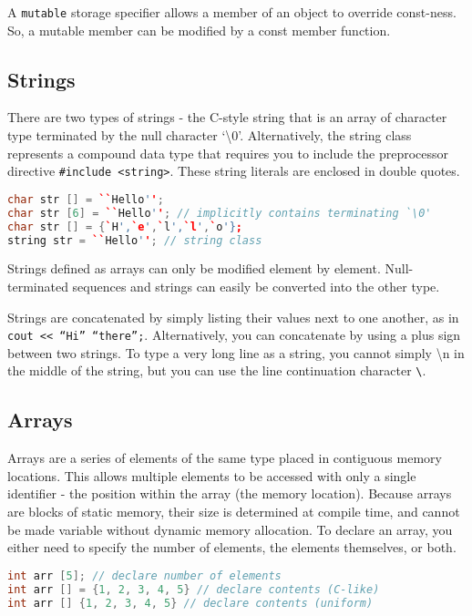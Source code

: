 \documentclass[10pt]{article}
\begin{document}
A \texttt{mutable} storage specifier allows a member of an object to override const-ness. So, a mutable member can be modified by a const member function.

\subsection{Strings}

There are two types of strings - the C-style string that is an array of character type terminated by the null character `\textbackslash0'. Alternatively, the string class represents a compound data type that requires you to include the preprocessor directive \texttt{\#include <string>}. These string literals are enclosed in double quotes.

\begin{lstlisting}[language=C++]
char str [] = ``Hello''; 
char str [6] = ``Hello''; // implicitly contains terminating `\0'
char str [] = {`H',`e',`l',`l',`o'};
string str = ``Hello''; // string class
\end{lstlisting}

Strings defined as arrays can only be modified element by element. Null-terminated sequences and strings can easily be converted into the other type.

Strings are concatenated by simply listing their values next to one another, as in \texttt{cout << ``Hi'' ``there'';}. Alternatively, you can concatenate by using a plus sign between two strings. To type a very long line as a string, you cannot simply \textbackslash n in the middle of the string, but you can use the line continuation character \texttt{\textbackslash}.

\subsection{Arrays}

Arrays are a series of elements of the same type placed in contiguous memory locations. This allows multiple elements to be accessed with only a single identifier - the position within the array (the memory location). Because arrays are blocks of static memory, their size is determined at compile time, and cannot be made variable without dynamic memory allocation. To declare an array, you either need to specify the number of elements, the elements themselves, or both.

\begin{lstlisting}[language=C++]
int arr [5]; // declare number of elements
int arr [] = {1, 2, 3, 4, 5} // declare contents (C-like)
int arr [] {1, 2, 3, 4, 5} // declare contents (uniform)
\end{lstlisting}
\end{document}
